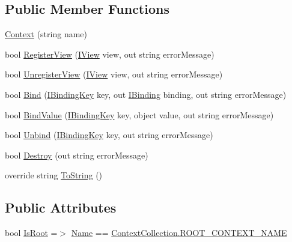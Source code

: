 \subsection*{Public Member Functions}
\begin{DoxyCompactItemize}
\item 
\mbox{\hyperlink{classcp_games_1_1core_1_1_rapid_m_v_c_1_1src_1_1_context_a6d5ad4907289280bed9944c9bfa43184}{Context}} (string name)
\item 
bool \mbox{\hyperlink{classcp_games_1_1core_1_1_rapid_m_v_c_1_1src_1_1_context_a382256a6867b84c58d9c69b995423e63}{Register\+View}} (\mbox{\hyperlink{interfacecp_games_1_1core_1_1_rapid_m_v_c_1_1_i_view}{I\+View}} view, out string error\+Message)
\item 
bool \mbox{\hyperlink{classcp_games_1_1core_1_1_rapid_m_v_c_1_1src_1_1_context_a5f033c640e3b84d53ff2bf330e2baf58}{Unregister\+View}} (\mbox{\hyperlink{interfacecp_games_1_1core_1_1_rapid_m_v_c_1_1_i_view}{I\+View}} view, out string error\+Message)
\item 
bool \mbox{\hyperlink{classcp_games_1_1core_1_1_rapid_m_v_c_1_1src_1_1_context_a47ae1588b3891b1cd10bd102e2799465}{Bind}} (\mbox{\hyperlink{interfacecp_games_1_1core_1_1_rapid_m_v_c_1_1_i_binding_key}{I\+Binding\+Key}} key, out \mbox{\hyperlink{interfacecp_games_1_1core_1_1_rapid_m_v_c_1_1_i_binding}{I\+Binding}} binding, out string error\+Message)
\item 
bool \mbox{\hyperlink{classcp_games_1_1core_1_1_rapid_m_v_c_1_1src_1_1_context_afc41dc6765626b99f60958bcbb31cf37}{Bind\+Value}} (\mbox{\hyperlink{interfacecp_games_1_1core_1_1_rapid_m_v_c_1_1_i_binding_key}{I\+Binding\+Key}} key, object value, out string error\+Message)
\item 
bool \mbox{\hyperlink{classcp_games_1_1core_1_1_rapid_m_v_c_1_1src_1_1_context_a7de73496fa8c30c2dfc84cb3e58c7543}{Unbind}} (\mbox{\hyperlink{interfacecp_games_1_1core_1_1_rapid_m_v_c_1_1_i_binding_key}{I\+Binding\+Key}} key, out string error\+Message)
\item 
bool \mbox{\hyperlink{classcp_games_1_1core_1_1_rapid_m_v_c_1_1src_1_1_context_af533afc2087ed95d2c5123a3c69f66c5}{Destroy}} (out string error\+Message)
\item 
override string \mbox{\hyperlink{classcp_games_1_1core_1_1_rapid_m_v_c_1_1src_1_1_context_a37d5c3af5fec76fb0eb38e925988f8fe}{To\+String}} ()
\end{DoxyCompactItemize}
\subsection*{Public Attributes}
\begin{DoxyCompactItemize}
\item 
bool \mbox{\hyperlink{classcp_games_1_1core_1_1_rapid_m_v_c_1_1src_1_1_context_a177c09f7544a9a9bb841819d858e1f20}{Is\+Root}} =$>$ \mbox{\hyperlink{classcp_games_1_1core_1_1_rapid_m_v_c_1_1src_1_1_context_a5e2a8abd51dae0bace9004b876502809}{Name}} == \mbox{\hyperlink{classcp_games_1_1core_1_1_rapid_m_v_c_1_1src_1_1_context_collection_a0f80312ff7ecedc098b2ee8e2c18d588}{Context\+Collection.\+R\+O\+O\+T\+\_\+\+C\+O\+N\+T\+E\+X\+T\+\_\+\+N\+A\+ME}}
\end{DoxyCompactItemize}
